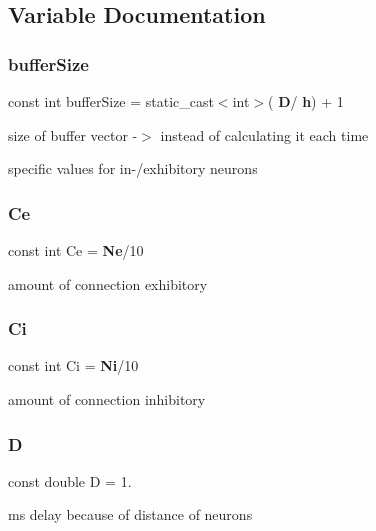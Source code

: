 \subsection{Variable Documentation}
\mbox{\label{constants_8h_a4cb7aa26412b9517e92b492fa0386879}} 
\subsubsection{buffer\+Size}
{\footnotesize\ttfamily const int buffer\+Size = static\+\_\+cast$<$int$>$(\textbf{ D}/\textbf{ h}) + 1}



size of buffer vector -\/$>$ instead of calculating it each time 

specific values for in-\//exhibitory neurons \mbox{\label{constants_8h_a4a9fd51283b56aa467c2c1897f1f91f7}} 
\subsubsection{Ce}
{\footnotesize\ttfamily const int Ce = \textbf{ Ne}/10}



amount of connection exhibitory 

\mbox{\label{constants_8h_ad5c0cafea18f89372a01f215f23976bb}} 
\subsubsection{Ci}
{\footnotesize\ttfamily const int Ci = \textbf{ Ni}/10}



amount of connection inhibitory 

\mbox{\label{constants_8h_a412464ee5e4d4e873c365d926d1970bb}} 
\subsubsection{D}
{\footnotesize\ttfamily const double D = 1.}



ms delay because of distance of neurons 

\mbox{\label{constants_8h_afb508c9e901b233efc4bfaa68d629570}} 
